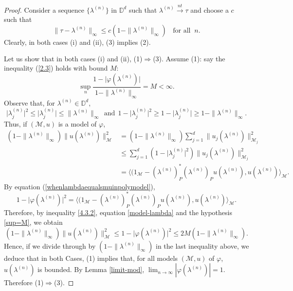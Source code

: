 \documentclass[11pt, reqno]{amsart}
\newcommand\1{\boldsymbol {1}}
\numberwithin{equation}{section}
\begin{document}
\begin{proof}
Consider  a sequence $\{\lambda^{(n)}\}$ in $\mathbb{D}^{d}$ such that $\lambda^{(n)}{\overset{nt}\rightarrow}\tau$
and choose a $c$ such that 
\begin{equation} \label{c-nontang}
\|\tau-\lambda^{(n)}\|_{\infty}\leq c(1-\|\lambda^{(n)}\|_{\infty}) \;\; \text{ for all} \; \; n. 
\end{equation}
Clearly, in both cases (i) and (ii), (3) implies (2).  

Let us show that in both cases (i) and (ii), (1)$\Rightarrow$(3). Assume (1): say the inequality  (\ref{2.3}) holds with bound $M$:  
\begin{equation}\label{sup=M}
\sup_{n}\dfrac{1-\lvert \varphi(\lambda^{(n)})\rvert}{1-\|\lambda^{(n)}\|_{\infty}}=M<\infty.
\end{equation}
Observe that, for $\lambda^{(n)}\in\mathbb{D}^{d}$, 
$$ \lvert \lambda^{(n)}_{j}\rvert^{2} \leq \lvert \lambda^{(n)}_{j} \rvert \leq \|\lambda^{(n)}\|_{\infty}~~\text{and}~~ 1-\lvert \lambda^{(n)}_{j}\rvert^{2} \geq 1- \lvert \lambda^{(n)}_{j} \rvert \geq 1- \|\lambda^{(n)}\|_{\infty}.$$
Thus, if $(\mathcal{M},u)$ is a model of $\varphi$,
\begin{align}
(1-\|\lambda^{(n)}\|_{\infty})\|u(\lambda^{(n)})\|_{\mathcal{M}}^{2} &= (1-\|\lambda^{(n)}\|_{\infty})\sum_{j=1}^{d}\|u_{j}(\lambda^{(n)})\|_{\mathcal{M}_{j}}^{2} \nonumber\\
&\leq \sum_{j=1}^{d}(1-\lvert \lambda^{(n)}_{j}\rvert^{2})\|u_{j}(\lambda^{(n)})\|_{\mathcal{M}_{j}}^{2} \nonumber\\
&=\bigg\langle(1_{\mathcal{M}}-(\lambda^{(n)})_{P}^{*}(\lambda^{(n)})_{P}u(\lambda^{(n)}),u(\lambda^{(n)})\bigg\rangle_{\mathcal{M}}. \label{4.3.2}
\end{align} 
By equation (\ref{whenlambdaequalsmuinpolymodel}),
\begin{equation} \label{model-lambda}
 1-\lvert \varphi(\lambda^{(n)})\rvert^{2}= \bigg\langle(1_{\mathcal{M}}-(\lambda^{(n)})_{P}^{*}(\lambda^{(n)})_{P}u(\lambda^{(n)}),u(\lambda^{(n)})\bigg\rangle_{\mathcal{M}}.
 \end{equation}
Therefore, by inequality \eqref{4.3.2}, equation \eqref{model-lambda} and the hypothesis \eqref{sup=M}, we obtain
$$(1-\|\lambda^{(n)}\|_{\infty})\|u(\lambda^{(n)})\|_{\mathcal{M}}^{2} \leq 1-\lvert \varphi(\lambda^{(n)})\rvert^{2}
\leq 2M(1-\|\lambda^{(n)}\|_{\infty}).$$ 
Hence, if we divide through by $(1-\|\lambda^{(n)}\|_{\infty})$ in the last inequality above, we deduce that in both Cases,  (1) implies that, for all models $(\mathcal{M},u)$ of  $ \varphi$, $u(\lambda^{(n)})$ is  bounded. By Lemma \ref{limit-mod},   $ \lim_{n \to \infty} |\varphi(\lambda^{(n)})| =1$. Therefore  (1)$\Rightarrow$(3). 


\end{proof}
\end{document}
